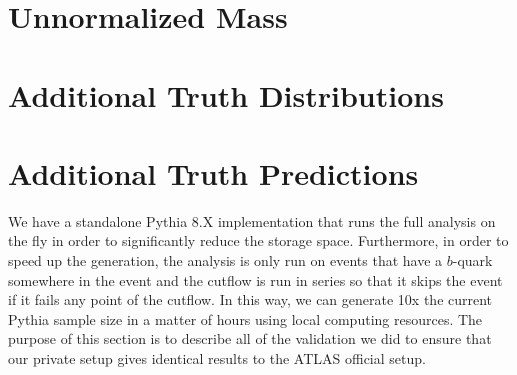 \documentclass[UKenglish,texlive=2013]{\ATLASLATEXPATH atlasdoc}
\begin{document}
\clearpage
\section{Unnormalized Mass}
\label{sec:app-trkmass}


\clearpage
\section{Additional Truth Distributions}
\label{sec:app-truth}


\clearpage
\section{Additional Truth Predictions}
\label{sec:app-truthpreds}

We have a standalone Pythia 8.X implementation that runs the full analysis on the fly in order to significantly reduce the storage space.  Furthermore, in order to speed up the generation, the analysis is only run on events that have a $b$-quark somewhere in the event and the cutflow is run in series so that it skips the event if it fails any point of the cutflow.  In this way, we can generate 10x the current Pythia sample size in a matter of hours using local computing resources.  The purpose of this section is to describe all of the validation we did to ensure that our private setup gives identical results to the ATLAS official setup.
\end{document}
